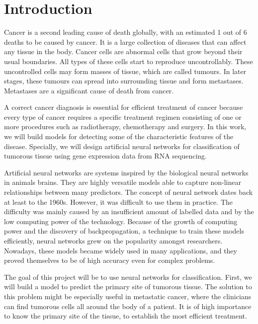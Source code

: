 \chapter*{Introduction}

Cancer is a second leading cause of death globally, with an estimated 1 out of 6 deaths to be caused by cancer. \cite{cancer}
It is a large collection of diseases that can affect any tissue in the body.
Cancer cells are abnormal cells that grow beyond their usual boundaries. 
All types of these cells start to reproduce uncontrollably.
These uncontrolled cells may form masses of tissue, which are called tumours. \cite{cancer2}
In later stages, these tumours can spread into surrounding tissue and form metastases.
Metastases are a significant cause of death from cancer.

A correct cancer diagnosis is essential for efficient treatment of cancer because every type of cancer requires a specific treatment regimen consisting of one or more procedures such as radiotherapy, chemotherapy and surgery.
In this work, we will build models for detecting some of the characteristic features of the disease.
Specially, we will design artificial neural networks for classification of tumorous tissue using gene expression data from RNA sequencing.

Artificial neural networks are systems inspired by the biological neural networks in animals brains.
They are highly versatile models able to capture non-linear relationships between many predictors.
The concept of neural network dates back at least to the 1960s. 
However, it was difficult to use them in practice. \cite{schmidhuber2015deep}
The difficulty was mainly caused by an insufficient amount of labelled data and by the low computing power of the technology.
Because of the growth of computing power and the discovery of backpropagation, a technique to train these models efficiently, neural networks grew on the popularity amongst researchers.
Nowadays, these models became widely used in many applications, and they proved themselves to be of high accuracy even for complex problems.

The goal of this project will be to use neural networks for classification.
First, we will build a model to predict the primary site of tumorous tissue.
The solution to this problem might be especially useful in metastatic cancer, where the clinicians can find tumorous cells all around the body of a patient.
It is of high importance to know the primary site of the tissue, to establish the most efficient treatment.

